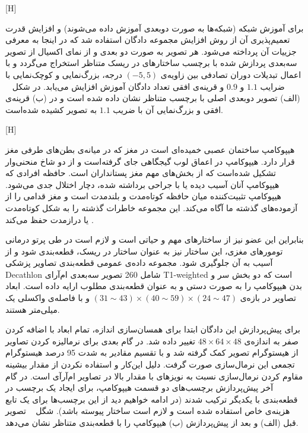 [H]

برای آموزش شبکه (شبکه‌ها به صورت دوبعدی آموزش داده می‌شوند) و افزایش قدرت تعمیم‌پذیری آن از روش افزایش مجموعه دادگان استفاده شد که در اینجا به معرفی جزییات آن پرداخته می‌شود. هر تصویر به صورت دو بعدی و از نمای اکسیال از تصویر سه‌بعدی پردازش شده با برچسب ساختارهای در ریسک متناظر استخراج می‌گردد و با اعمال تبدیلات دوران تصادفی بین زاویه‌ی $(-5,5)$ درجه، بزرگ‌نمایی و کوچک‌نمایی با ضرایب $1.1$ و $0.9$ و قرینه‌ی افقی تعداد دادگان آموزش افزایش می‌یابد. در شکل ~ (الف) تصویر دوبعدی اصلی با برچسب‌ متناظر نشان داده شده است و در (ب) قرینه‌ی افقی و بزرگ‌نمایی آن با ضریب $1.1$ به تصویر کشیده شده‌است.

[H]


هیپوکامپ ساختمان عصبی خمیده‌ای است در مغز که در میانه‌ی بطن‌های طرفی مغز قرار دارد. هیپوکامپ در اعماق لوب گیجگاهی جای گرفته‌است و از دو شاخ منحنی‌وار تشکیل شده‌است که از بخش‌های مهم مغز پستانداران است. حافظه افرادی که هیپوکامپ آنان آسیب دیده یا با جراحی برداشته شده، دچار اختلال جدی می‌شود. هیپوکامپ تثبیت‌کننده میان حافظه کوتاه‌مدت و بلندمدت است و مغز قدامی را از آزموده‌های گذشته ما آگاه می‌کند. این مجموعه خاطرات گذشته را به شکل کوتاه‌مدت یا درازمدت حفظ می‌کند . 

بنابراین این عضو نیز از ساختارهای مهم و حیاتی است و لازم است در طی پرتو درمانی تومورهای مغزی، این ساختار نیز به عنوان ساختار در ریسک، قطعه‌بندی شود و از آسیب به آن جلوگیری شود. مجموعه داده‌ی عمومی قطعه‌بندی تصاویر پزشکی Decathlon  شامل 260 تصویر سه‌بعدی ام‌آرای T1-weighted است که دو بخش سر و بدن هیپوکامپ را به صورت دستی و به عنوان قطعه‌بندی مطلوب ارایه داده است. ابعاد تصاویر در بازه‌ی 
$(31\sim43)\times(40\sim59)\times(24\sim47)$
و با فاصله‌ی واکسلی یک میلی‌متر هستند. 

برای پیش‌پردازش این دادگان ابتدا برای همسان‌سازی اندازه، تمام ابعاد با اضافه کردن صفر به اندازه‌ی $48\times64\times48$ تغییر داده شد. در گام‌ بعدی برای نرمالیزه کردن تصاویر از هیستوگرام تصویر کمک گرفته شد و با تقسیم مقادیر به شدت 95 درصد هیستوگرام تجمعی این نرمال‌سازی صورت گرفت. دلیل این‌کار و استفاده نکردن از مقدار بیشینه مقاوم کردن نرمال‌سازی نسبت به نویزهای با مقدار بالا در تصاویر ام‌آرآی است. در گام آخر پیش‌پردازش برچسب‌های دو قسمت هیپوکامپ، برای ایجاد یک برچسب در قطعه‌بندی با یکدیگر ترکیب شدند (در ادامه خواهیم دید از این برچسب‌ها برای یک تابع هزینه‌ی خاص استفاده شده است و لازم است ساختار پیوسته باشد). شگل ~ تصویر قبل (الف) و بعد از پیش‌پردازش (ب) هیپوکامپ را با قطعه‌بندی متناظر نشان می‌دهد.

